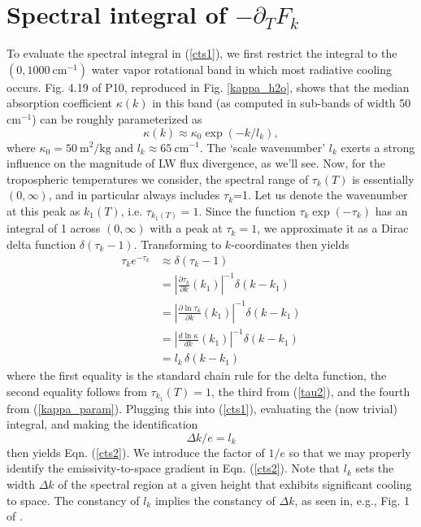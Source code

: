 \documentclass[10pt]{article}
\newcommand{\beqn}{\begin{equation}}
\newcommand{\eeqn}{\end{equation}}
\newcommand{\eqnref}[1]{(\ref{#1})}
\newcommand{\n}{\nonumber}
\newcommand{\inverse}{^{-1}}
\newcommand{\partialderf}[2]{\ensuremath{\frac{\partial #1}{\partial #2}}}
\newcommand{\der}[2]{\ensuremath{\frac{d #1}{d #2}}}
\newcommand{\ppt}{\ensuremath{\partial_T}}
\newcommand{\cminverse}{\ensuremath{\mathrm{cm^{-1}}}}
\newcommand{\pierre}{P10}
\newcommand{\tauk}{\ensuremath{\tau_k}}
\begin{document}

	\section{Spectral integral of $-\ppt F_k$} \label{appendix_pptf_formula}
	To evaluate the spectral integral in \eqnref{cts1}, we first restrict the integral to the  $(0,1000\ \cminverse)$ water vapor rotational band in which most radiative cooling occurs.  Fig. 4.19 of \pierre, reproduced in Fig. \ref{kappa_h2o}, shows that the median absorption coefficient $\kappa(k)$ in this band (as computed in sub-bands of width 50 \cminverse) can be roughly parameterized as 
		\beqn
			\kappa(k) \approx \kappa_0 \exp(-k/l_k), 
		\label{kappa_param}
		\eeqn
		where $\kappa_0 = 50\ \mathrm{m^2/kg}$ and $l_k \approx 65\ \cminverse$. The `scale wavenumber' $l_k$  exerts a strong influence  on the magnitude of LW flux divergence, as we'll see. Now,  for the tropospheric temperatures we consider, the spectral range of $\tauk(T)$ is essentially $(0,\infty)$, and in particular always includes \tauk=1. Let us denote the wavenumber at this peak as $k_1(T)$, i.e.  $\tau_{k_1(T)}=1$.  Since the function $\tauk \exp(-\tauk)$ has an integral of 1 across $(0,\infty)$ with a peak  at $\tauk=1$,  we  approximate it as a Dirac delta function $\delta(\tauk- 1)$. Transforming to $k$-coordinates then yields
       \begin{align}
                \tau_k e^{-\tau_k} & \approx \delta(\tau_k- 1)  \n \\
                                            & = \left|\partialderf{\tau_k}{k}(k_1)\right|\inverse\delta(k-k_1) \n  \\
                                            & =  \left|\partialderf{\ln\tau_k}{k}(k_1)\right|\inverse\delta(k-k_1) \n  \\ 
                                            & =  \left|\der{\ln\kappa}{k}(k_1)\right|\inverse\delta(k-k_1) \n \\
                                            & = l_k\,  \delta(k-k_1) \n \label{delta_approx}
        \end{align}
where the first equality is the standard chain rule for the delta function, the second equality follows from $\tau_{k_1}(T)=1$, the third from \eqnref{tau2}, and the fourth from \eqnref{kappa_param}. Plugging this into \eqnref{cts1}, evaluating the (now trivial) integral, and making the identification 
	\beqn
		\Delta k/e = l_k
		\n
		\label{Deltak}
	\eeqn
	then yields Eqn. \eqnref{cts2}. We introduce the factor of $1/e$ so that we may properly identify the emissivity-to-space gradient in Eqn. \eqnref{cts2}. Note that $l_k$ sets the width $\Delta k$ of the spectral region at a given height that exhibits significant cooling to space. The constancy of  $l_k$ implies the constancy of  $\Delta k$, as seen in, e.g., Fig. 1 of \cite{huang2013}.
\end{document}
